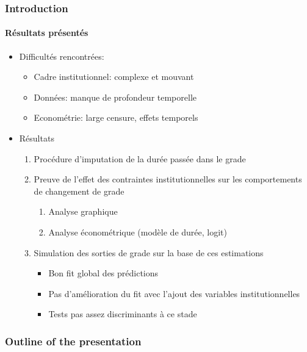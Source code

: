 \documentclass[xcolor=table,ignorenonframetext,12pt]{beamer}
\newenvironment{choixmarges}[2]{\begin{list}{}{%
\setlength{\topsep}{0pt}%
\setlength{\leftmargin}{0pt}%
\setlength{\rightmargin}{0pt}%
\setlength{\listparindent}{\parindent}%
\setlength{\itemindent}{\parindent}%
\setlength{\parsep}{0pt plus 1pt}%
\addtolength{\leftmargin}{#1}%
\addtolength{\rightmargin}{#2}%
}\item }{\end{list}}
\begin{document}
\begin{frame}
\frametitle{Introduction}
\framesubtitle{Résultats présentés}

\begin{choixmarges}{-0.5cm}{-0.5cm}


\begin{itemize}
\item Difficultés rencontrées: 
	\begin{itemize}
	\item Cadre institutionnel: complexe et mouvant
	\item Données: manque de profondeur temporelle 
	\item Econométrie: large censure, effets temporels
	\end{itemize}
 
 \vspace{0.2cm} 
\item Résultats 
	\begin{enumerate}
	\item Procédure d'imputation de la durée passée dans le grade
	\item Preuve de l'effet des contraintes institutionnelles sur les comportements de changement de grade	
		\begin{enumerate}
		\item Analyse graphique
		\item Analyse économétrique (modèle de durée, logit)
		\end{enumerate}
	\item Simulation des sorties de grade sur la base de ces estimations	
		\begin{itemize}
		\item Bon fit global des prédictions
		\item Pas d'amélioration du fit avec l'ajout des variables institutionnelles
		\item Tests pas assez discriminants à ce stade
		\end{itemize}
	 \end{enumerate}
 
	
	\end{itemize}
 

\end{choixmarges}
\end{frame}



\begin{frame}
    \frametitle{Outline of the presentation}
    \tableofcontents[hidesubsections]
\end{frame}
\end{document}
